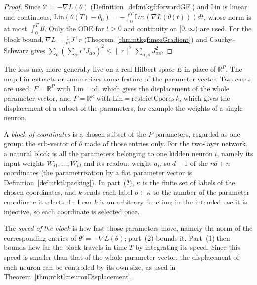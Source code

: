 \begin{proof}
  \leanok
Since $\theta'=-\nabla L(\theta)$ (Definition~\ref{def:ntkgf:forwardGF}) and $\mathrm{Lin}$ is linear and continuous, $\mathrm{Lin}(\theta(T)-\theta_0)=-\int_0^T\mathrm{Lin}(\nabla L(\theta(t)))dt$, whose norm is at most $\int_0^TB$. Only the ODE for $t>0$ and continuity on
$[0,\infty)$ are used. For the block bound, $\nabla L=\frac1mJ^\top r$ (Theorem~\ref{thm:ntkgf:mseGradient}) and Cauchy--Schwarz gives $\sum_o(\sum_\alpha r^\alpha J_{\alpha o})^2\le\|r\|^2\sum_{\alpha,o}J_{\alpha o}^2$.
\end{proof}

\begin{remark}\label{rmk:ntkgf:displacementLinearReading}
The loss may more generally live on a real Hilbert space $E$ in place of $\mathbb R^P$. The map $\mathrm{Lin}$ extracts or summarizes some feature of the parameter vector. Two cases are used: $F=\mathbb R^P$ with $\mathrm{Lin}=\mathrm{id}$, which gives the displacement of the whole parameter vector, and $F=\mathbb R^\kappa$ with $\mathrm{Lin}=\mathrm{restrictCoords}\,k$, which gives the displacement of a subset of the parameters, for example the weights of a single neuron.

A \emph{block of coordinates} is a chosen subset of the $P$ parameters, regarded as one group: the sub-vector of $\theta$ made of those entries only. For the two-layer network, a natural block is all the parameters belonging to one hidden neuron $i$, namely its input weights $W_{i1},\dots,W_{id}$ and its readout weight $a_i$, so $d+1$ of the $nd+n$ coordinates (the parametrization by a flat parameter vector is Definition~\ref{def:ntktl:packing}).
In part~(2), $\kappa$ is the finite set of labels of the chosen coordinates, and $k$ sends each label $o\in\kappa$ to the number of the parameter coordinate it selects. In Lean $k$ is an arbitrary function; in the intended use it is injective, so each coordinate is selected once.

The \emph{speed of the block} is how fast those parameters move, namely the norm of the corresponding entries of $\theta'=-\nabla L(\theta)$; part~(2) bounds it. Part~(1) then bounds how far the block travels in time $T$ by integrating its speed. Since this speed is smaller than that of the whole parameter vector, the displacement of each neuron can be controlled by its own size, as used in Theorem~\ref{thm:ntktl:neuronDisplacement}.
\end{remark}

